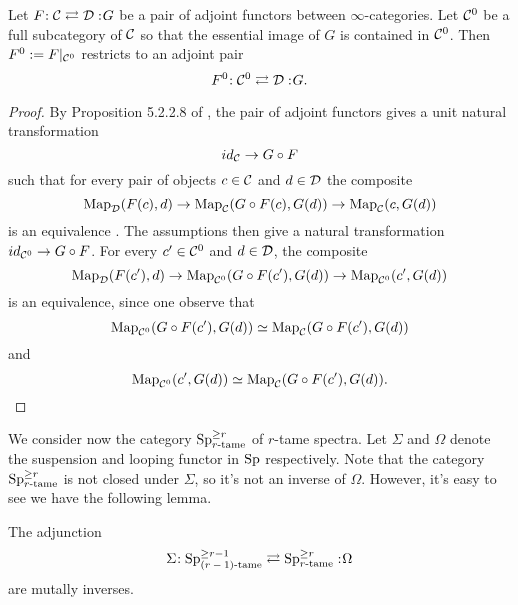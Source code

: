 




\begin{proposition}
\label{Restrict adjoints to full subcategory}
	Let $F\negmedspace: {\mathcal{C}}\rightleftarrows {\mathcal{D}}:\negmedspace G$ be a pair of adjoint functors between $\infty$-categories.
	Let ${\mathcal{C}}^0$ be a full subcategory of ${\mathcal{C}}$ so that the essential image of $G$ is contained in ${\mathcal{C}}^0$. Then $F^0:=F|_{{\mathcal{C}}^0}$ restricts to an adjoint pair 
	$$
	F^0\negmedspace: {\mathcal{C}}^0\rightleftarrows {\mathcal{D}}:\negmedspace G.
	$$
\end{proposition}
\begin{proof}
    By Proposition 5.2.2.8 of \cite{HTT}, the pair of adjoint functors gives a unit natural transformation
    \[
    id_{{\mathcal{C}}} \to G\circ F
    \]
    such that for every pair of objects $c\in {\mathcal{C}}$ and $d\in {\mathcal{D}}$ the composite
    \[
    \operatorname{Map}_{{\mathcal{D}}}(F(c),d) \to \operatorname{Map}_{\mathcal{C}}(G\circ F(c),G(d)) \to \operatorname{Map}_{{\mathcal{C}}}(c,G(d))
    \]
    is an equivalence .
	The assumptions then give a natural transformation $id_{{\mathcal{C}}^{0}}\to G\circ F$.
	For every $c'\in {\mathcal{C}}^0$ and $d\in {\mathcal{D}}$, the composite 
	\[
	\operatorname{Map}_{{\mathcal{D}}}(F(c'),d) \to \operatorname{Map}_{{\mathcal{C}}^0}(G\circ F(c'),G(d)) \to \operatorname{Map}_{{\mathcal{C}}^{0}}(c',G(d))
	\] 
	is an equivalence, since one observe that
	$$
	\operatorname{Map}_{{\mathcal{C}}^0}(G\circ F(c'),G(d))\simeq \operatorname{Map}_{{\mathcal{C}}}(G\circ F(c'),G(d))
	$$
	and 
	$$
	\operatorname{Map}_{{\mathcal{C}}^0}(c',G(d))\simeq \operatorname{Map}_{{\mathcal{C}}}(G\circ F(c'),G(d)).
	$$
	\end{proof}


We consider now the category $\operatorname{Sp}^{\geq r}_{\text{$r$-tame}}$ of $r$-tame spectra.
Let $\Sigma$ and $\Omega$ denote the suspension and looping functor in $\operatorname{Sp}$ respectively.
Note that the category $\operatorname{Sp}^{\geq r}_{\text{$r$-tame}}$ is not closed under $\Sigma$, so it's not an inverse of $\Omega$.
However, it's easy to see we have the following lemma.
\begin{lemma}
\label{Relations between different tameness}
	The adjunction
	\[
	\Sigma\negmedspace: \operatorname{Sp}^{\geq r-1}_{\text{$(r-1)$-tame}}\rightleftarrows \operatorname{Sp}^{\geq r}_{\text{$r$-tame}}:\negmedspace \Omega
	\]
	are mutally inverses.
\end{lemma} 

